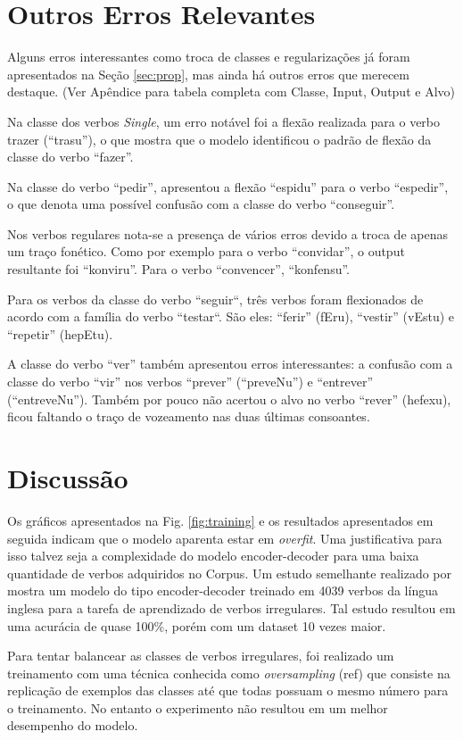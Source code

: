 \section{Outros Erros Relevantes}
\label{sec:interesting}

Alguns erros interessantes como troca de classes e regularizações já foram apresentados na Seção \ref{sec:prop}, mas ainda há outros erros que merecem destaque. (Ver Apêndice para tabela completa com Classe, Input, Output e Alvo)

Na classe dos verbos \textit{Single}, um erro notável foi a flexão realizada para o verbo trazer (“trasu”), o que mostra que o modelo identificou o padrão de flexão da classe do verbo “fazer”. 

Na classe do verbo “pedir”, apresentou a flexão “espidu” para o verbo “espedir”, o que denota uma possível confusão com a classe do verbo “conseguir”.

Nos verbos regulares nota-se a presença de vários erros devido a troca de apenas um traço fonético. Como por exemplo para o verbo “convidar”, o output resultante foi “konviru”. Para o verbo “convencer”, “konfensu”.

Para os verbos da classe do verbo “seguir“, três verbos foram flexionados de acordo com a família do verbo “testar“. São eles: “ferir” (fEru), “vestir” (vEstu) e “repetir” (hepEtu).

A classe do verbo “ver” também apresentou erros interessantes: a confusão com a classe do verbo “vir” nos verbos “prever” (“preveNu”) e “entrever” (“entreveNu”). Também por pouco não acertou o alvo no verbo “rever” (hefexu), ficou faltando o traço de vozeamento nas duas últimas consoantes.

\section{Discussão}

Os gráficos apresentados na Fig. \ref{fig:training} e os resultados apresentados em seguida indicam que o modelo aparenta estar em \textit{overfit}. Uma justificativa para isso talvez seja a complexidade do modelo encoder-decoder para uma baixa quantidade de verbos adquiridos no Corpus. Um estudo semelhante realizado por \cite{kirov:2018} mostra um modelo do tipo encoder-decoder treinado em 4039 verbos da língua inglesa para a tarefa de aprendizado de verbos irregulares. Tal estudo resultou em uma acurácia de quase 100\%, porém com um dataset 10 vezes maior.

Para tentar balancear as classes de verbos irregulares, foi realizado um treinamento com uma técnica conhecida como \textit{oversampling} (ref) que consiste na replicação de exemplos das classes até que todas possuam o mesmo número para o treinamento. No entanto o experimento não resultou em um melhor desempenho do modelo. 






